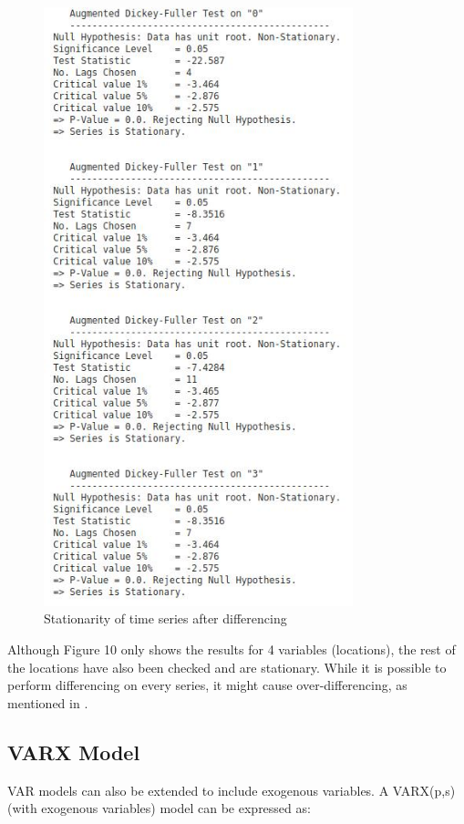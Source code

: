 \documentclass[12pt, letterpaper] {article}
\begin{document}
\begin{figure}[H]
    \centering
    \includegraphics[width=0.8\textwidth, height=0.8\textheight]{Images/stationarity.jpg}
    \caption{Stationarity of time series after differencing}
    \label{fig:Stationarity of time series after differencing}
\end{figure}

\noindent Although Figure 10 only shows the results for 4 variables (locations), the rest of the locations have also been checked and are stationary. 
While it is possible to perform differencing on every series, it might cause over-differencing, as mentioned in \cite{Ruey2014}.

\subsection{VARX Model}
VAR models can also be extended to include exogenous variables. A VARX(p,s) (with exogenous variables) model can be expressed as:
\end{document}

